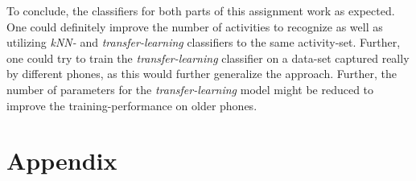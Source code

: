 \documentclass[journal]{IEEEtran}
\begin{document}
To conclude, the classifiers for both parts of this assignment work as expected.
One could definitely improve the number of activities to recognize as well as
utilizing \textit{kNN-} and \textit{transfer-learning} classifiers to the same
activity-set. Further, one could try to train the \textit{transfer-learning}
classifier on a data-set captured really by different phones, as this would
further generalize the approach. Further, the number of parameters for the
\textit{transfer-learning} model might be reduced to improve the
training-performance on older phones. 




\section{Appendix}

\printbibliography
\end{document}
